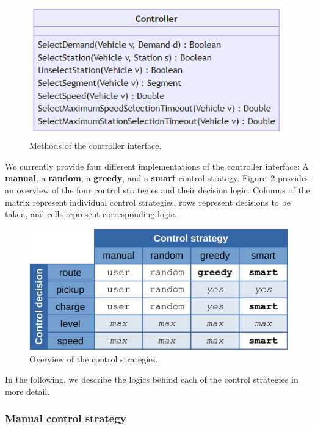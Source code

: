 \documentclass[a4paper,twoside]{article}
\begin{document}
	\begin{figure}[!ht]
		\centering
		\includegraphics[scale=0.3]{../../diagrams/controller/classes-minimal.png}
		\caption{Methods of the controller interface.}
		\label{fig:controller-interface}
	\end{figure}
	
	We currently provide four different implementations of the controller interface: A \textbf{manual}, a \textbf{random}, a \textbf{greedy}, and a \textbf{smart} control strategy.
	Figure~\ref{fig:control-strategies} provides an overview of the four control strategies and their decision logic.
	Columns of the matrix represent individual control strategies, rows represent decisions to be taken, and cells represent corresponding logic.
	
	\begin{figure}[!ht]
		\centering
		\includegraphics[width=0.65\columnwidth]{control_strategy_overview.png}
		\caption{Overview of the control strategies.}
		\label{fig:control-strategies}
	\end{figure}
	
	In the following, we describe the logics behind each of the control strategies in more detail.
	
	\subsubsection*{Manual control strategy}
	\label{sec:controller-manual}
	
\end{document}
